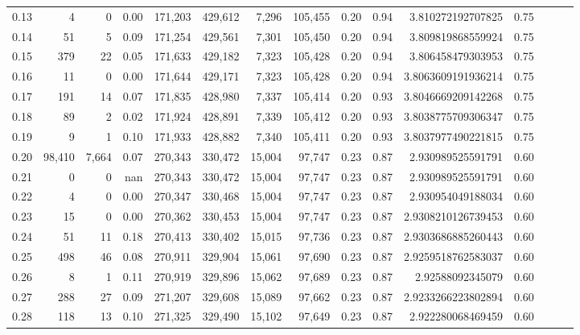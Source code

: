 \begin{tabular}{rrrrrrrrrrrrrrr}
0.13 &       4 &       0 &  0.00 &  171,203 &  429,612 &    7,296 &  105,455 &  0.20 &  0.94 &     3.810272192707825 &      0.75 \\
0.14 &      51 &       5 &  0.09 &  171,254 &  429,561 &    7,301 &  105,450 &  0.20 &  0.94 &     3.809819868559924 &      0.75 \\
0.15 &     379 &      22 &  0.05 &  171,633 &  429,182 &    7,323 &  105,428 &  0.20 &  0.94 &     3.806458479303953 &      0.75 \\
0.16 &      11 &       0 &  0.00 &  171,644 &  429,171 &    7,323 &  105,428 &  0.20 &  0.94 &    3.8063609191936214 &      0.75 \\
0.17 &     191 &      14 &  0.07 &  171,835 &  428,980 &    7,337 &  105,414 &  0.20 &  0.93 &    3.8046669209142268 &      0.75 \\
0.18 &      89 &       2 &  0.02 &  171,924 &  428,891 &    7,339 &  105,412 &  0.20 &  0.93 &    3.8038775709306347 &      0.75 \\
0.19 &       9 &       1 &  0.10 &  171,933 &  428,882 &    7,340 &  105,411 &  0.20 &  0.93 &    3.8037977490221815 &      0.75 \\
0.20 &  98,410 &   7,664 &  0.07 &  270,343 &  330,472 &   15,004 &   97,747 &  0.23 &  0.87 &     2.930989525591791 &      0.60 \\
0.21 &       0 &       0 &   nan &  270,343 &  330,472 &   15,004 &   97,747 &  0.23 &  0.87 &     2.930989525591791 &      0.60 \\
0.22 &       4 &       0 &  0.00 &  270,347 &  330,468 &   15,004 &   97,747 &  0.23 &  0.87 &     2.930954049188034 &      0.60 \\
0.23 &      15 &       0 &  0.00 &  270,362 &  330,453 &   15,004 &   97,747 &  0.23 &  0.87 &    2.9308210126739453 &      0.60 \\
0.24 &      51 &      11 &  0.18 &  270,413 &  330,402 &   15,015 &   97,736 &  0.23 &  0.87 &    2.9303686885260443 &      0.60 \\
0.25 &     498 &      46 &  0.08 &  270,911 &  329,904 &   15,061 &   97,690 &  0.23 &  0.87 &    2.9259518762583037 &      0.60 \\
0.26 &       8 &       1 &  0.11 &  270,919 &  329,896 &   15,062 &   97,689 &  0.23 &  0.87 &      2.92588092345079 &      0.60 \\
0.27 &     288 &      27 &  0.09 &  271,207 &  329,608 &   15,089 &   97,662 &  0.23 &  0.87 &    2.9233266223802894 &      0.60 \\
0.28 &     118 &      13 &  0.10 &  271,325 &  329,490 &   15,102 &   97,649 &  0.23 &  0.87 &     2.922280068469459 &      0.60 \\

\end{tabular}
